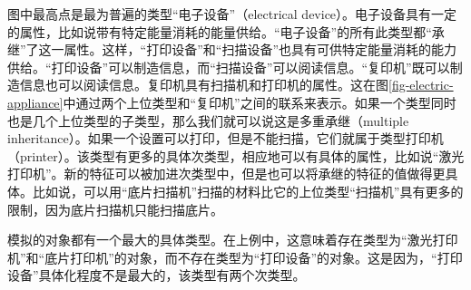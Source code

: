 图中最高点是最为普遍的类型“电子设备”（electrical device）。电子设备具有一定的属性，比如说带有特定能量消耗的能量供给。“电子设备”的所有此类型都“承继”了这一属性。这样，“打印设备”和“扫描设备”也具有可供特定能量消耗的能力供给。“打印设备”可以制造信息，而“扫描设备”可以阅读信息。“复印机”既可以制造信息也可以阅读信息。复印机具有扫描机和打印机的属性。这在图\ref{fig-electric-appliance}中通过两个上位类型和“复印机”之间的联系来表示。如果一个类型同时也是几个上位类型的子类型，那么我们就可以说这是多重承继（multiple inheritance）。如果一个设置可以打印，但是不能扫描，它们就属于类型打印机（printer）。该类型有更多的具体次类型，相应地可以有具体的属性，比如说“激光打印机”。新的特征可以被加进次类型中，但是也可以将承继的特征的值做得更具体。比如说，可以用“底片扫描机”扫描的材料比它的上位类型“扫描机”具有更多的限制，因为底片扫描机只能扫描底片。

模拟的对象都有一个最大的具体类型。在上例中，这意味着存在类型为“激光打印机”和“底片打印机”的对象，而不存在类型为“打印设备”的对象。这是因为，“打印设备”具体化程度不是最大的，该类型有两个次类型。

